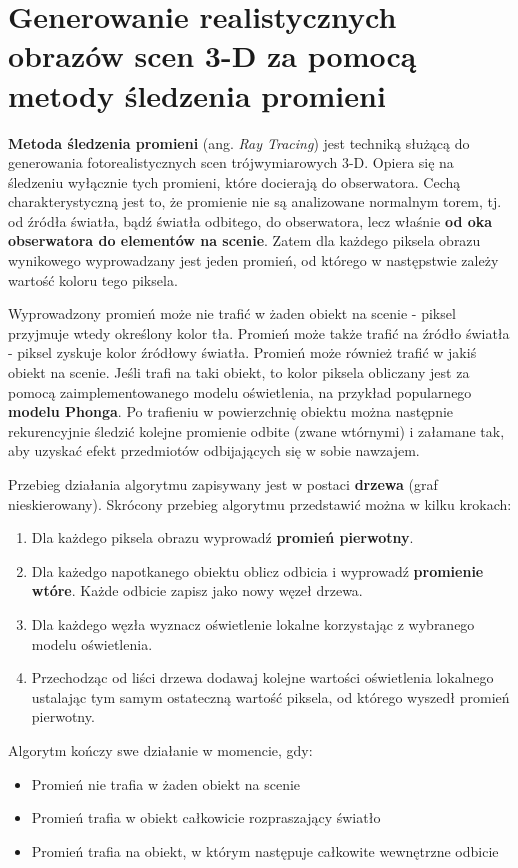 \section{Generowanie realistycznych obrazów scen 3-D za pomocą metody śledzenia promieni}

\textbf{Metoda śledzenia promieni} (ang. \textit{Ray Tracing}) jest techniką służącą do generowania fotorealistycznych scen trójwymiarowych 3-D. Opiera się na śledzeniu wyłącznie tych promieni, które docierają do obserwatora. Cechą charakterystyczną jest to, że promienie nie są analizowane normalnym torem, tj. od źródła światła, bądź światła odbitego, do obserwatora, lecz właśnie \textbf{od oka obserwatora do elementów na scenie}. Zatem dla każdego piksela obrazu wynikowego wyprowadzany jest jeden promień, od którego w następstwie zależy wartość koloru tego piksela.

Wyprowadzony promień może nie trafić w żaden obiekt na scenie - piksel przyjmuje wtedy określony kolor tła. Promień może także trafić na źródło światła - piksel zyskuje kolor źródłowy światła. Promień może również trafić w jakiś obiekt na scenie. Jeśli trafi na taki obiekt, to kolor piksela obliczany jest za pomocą zaimplementowanego modelu oświetlenia, na przykład popularnego \textbf{modelu Phonga}. Po trafieniu w powierzchnię obiektu można następnie rekurencyjnie śledzić kolejne promienie odbite (zwane wtórnymi) i załamane tak, aby uzyskać efekt przedmiotów odbijających się w sobie nawzajem.

Przebieg działania algorytmu zapisywany jest w postaci \textbf{drzewa} (graf nieskierowany). Skrócony przebieg algorytmu przedstawić można w kilku krokach:
\begin{enumerate}
	\item Dla każdego piksela obrazu wyprowadź \textbf{promień pierwotny}.
    \item Dla każedgo napotkanego obiektu oblicz odbicia i wyprowadź \textbf{promienie wtóre}. Każde odbicie zapisz jako nowy węzeł drzewa.
    \item Dla każdego węzła wyznacz oświetlenie lokalne korzystając z wybranego modelu oświetlenia.
    \item Przechodząc od liści drzewa dodawaj kolejne wartości oświetlenia lokalnego ustalając tym samym ostateczną wartość piksela, od którego wyszedł promień pierwotny.
\end{enumerate}

Algorytm kończy swe działanie w momencie, gdy:
\begin{itemize}
	\item Promień nie trafia w żaden obiekt na scenie
    \item Promień trafia w obiekt całkowicie rozpraszający światło
    \item Promień trafia na obiekt, w którym następuje całkowite wewnętrzne odbicie
\end{itemize}

